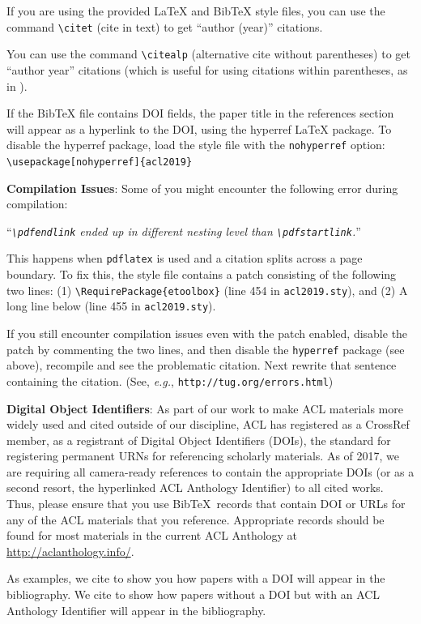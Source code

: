 \documentclass[11pt,a4paper]{article}
\begin{document}
If you are using the provided \LaTeX{} and Bib\TeX{} style files, you
can use the command \verb|\citet| (cite in text)
to get ``author (year)'' citations.

You can use the command \verb|\citealp| (alternative cite without 
parentheses) to get ``author year'' citations (which is useful for 
using citations within parentheses, as in \citealp{Gusfield:97}).

If the Bib\TeX{} file contains DOI fields, the paper
title in the references section will appear as a hyperlink
to the DOI, using the hyperref \LaTeX{} package.
To disable the hyperref package, load the style file
with the \verb|nohyperref| option: \\{\small
\verb|\usepackage[nohyperref]{acl2019}|}

\textbf{Compilation Issues}: Some of you might encounter the following error during compilation: 

``{\em \verb|\pdfendlink| ended up in different nesting level than \verb|\pdfstartlink|.}''

This happens when \verb|pdflatex| is used and a citation splits across a page boundary. To fix this, the style file contains a patch consisting of the following two lines: (1) \verb|\RequirePackage{etoolbox}| (line 454 in \texttt{acl2019.sty}), and (2) A long line below (line 455 in \texttt{acl2019.sty}).

If you still encounter compilation issues even with the patch enabled, disable the patch by commenting the two lines, and then disable the \verb|hyperref| package (see above), recompile and see the problematic citation.
Next rewrite that sentence containing the citation. (See, {\em e.g.}, {\small\tt http://tug.org/errors.html})

\textbf{Digital Object Identifiers}:  As part of our work to make ACL
materials more widely used and cited outside of our discipline, ACL
has registered as a CrossRef member, as a registrant of Digital Object
Identifiers (DOIs), the standard for registering permanent URNs for
referencing scholarly materials.  As of 2017, we are requiring all
camera-ready references to contain the appropriate DOIs (or as a
second resort, the hyperlinked ACL Anthology Identifier) to all cited
works.  Thus, please ensure that you use Bib\TeX\ records that contain
DOI or URLs for any of the ACL materials that you reference.
Appropriate records should be found for most materials in the current
ACL Anthology at \url{http://aclanthology.info/}.

As examples, we cite \cite{P16-1001} to show you how papers with a DOI
will appear in the bibliography.  We cite \cite{C14-1001} to show how
papers without a DOI but with an ACL Anthology Identifier will appear
in the bibliography.  
\end{document}
